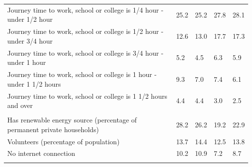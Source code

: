 \documentclass{article}
\begin{document}
\begin{table}[h]
\begin{tabular}{KTTTT}
Journey time to work, school or college is 1/4 hour - under 1/2 hour & 25.2& 25.2& 27.8& 28.1\\
Journey time to work, school or college is 1/2 hour - under 3/4 hour & 12.6& 13.0& 17.7& 17.3\\
Journey time to work, school or college is 3/4 hour - under 1 hour & 5.2& 4.5& 6.3& 5.9\\
Journey time to work, school or college is 1 hour - under 1 1/2 hours & 9.3& 7.0& 7.4& 6.1\\
Journey time to work, school or college is 1 1/2 hours and over & 4.4& 4.4& 3.0& 2.5\\
\hline
    \\ 
    \hline
Has renewable energy source (percentage of permanent private households) & 28.2& 26.2& 19.2& 22.9\\
    \hline
Volunteers (percentage of population) & 13.7& 14.4& 12.5& 13.8\\
    \hline
No internet connection& 10.2& 10.9&  7.2&  8.7\\
\hline
\end{tabular}
\end{table}
\end{document}
